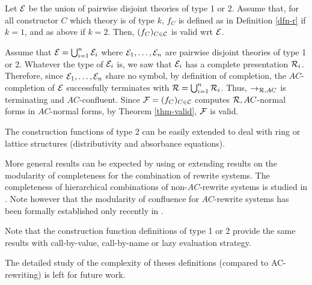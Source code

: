 \begin{thm}
Let $\mathcal{E}$ be the union of pairwise disjoint theories of type 1 or
2. Assume that, for all constructor $C$ which theory is of type $k$,
$f_C$ is defined as in Definition \ref{dfn-r} if $k=1$, and as above
if $k=2$. Then, $(f_C)_{C\in\mathcal{C}}$ is valid wrt $\mathcal{E}$.
\end{thm}

\begin{prf}
Assume that $\mathcal{E}=\bigcup_{i=1}^n\mathcal{E}_i$ where $\mathcal{E}_1,\ldots,\mathcal{E}_n$ are
pairwise disjoint theories of type 1 or 2. Whatever the type of
$\mathcal{E}_i$ is, we saw that $\mathcal{E}_i$ has a complete presentation
$\mathcal{R}_i$. Therefore, since $\mathcal{E}_1,\ldots,\mathcal{E}_n$ share no symbol, by
definition of completion, the $AC$-completion of $\mathcal{E}$ successfully
terminates with $\mathcal{R}=\bigcup_{i=1}^n\mathcal{R}_i$. Thus, $\rightarrow_{\mathcal{R},AC}$ is
terminating and $AC$-confluent. Since $\mathcal{F}=(f_C)_{C\in\mathcal{C}}$
computes $\mathcal{R},AC$-normal forms in $AC$-normal forms, by Theorem
\ref{thm-valid}, $\mathcal{F}$ is valid.\cqfd\\
\end{prf}

The construction functions of type 2 can be easily extended to deal
with ring or lattice structures (distributivity and absorbance
equations).

More general results can be expected by using or extending results on
the modularity of completeness for the combination of rewrite
systems. The completeness of hierarchical combinations of
non-$AC$-rewrite systems is studied in \cite{rao93fsttcs}. Note
however that the modularity of confluence for $AC$-rewrite systems has
been formally established only recently in \cite{jouannaud06rta}.

Note that the construction function definitions of type 1 or 2 provide
the same results with call-by-value, call-by-name or lazy evaluation
strategy.

The detailed study of the complexity of theses definitions (compared
to AC-rewriting) is left for future work.
